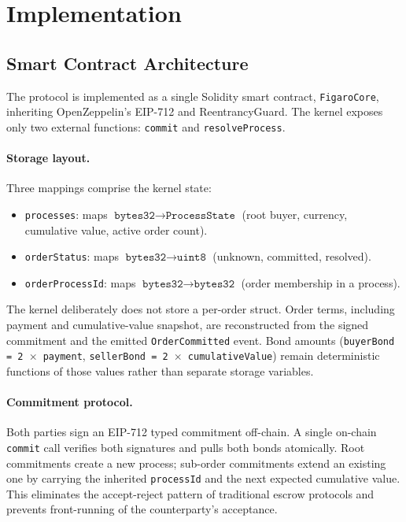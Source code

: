 \documentclass[11pt,a4paper]{article}
\theoremstyle{definition}
\theoremstyle{remark}
\begin{document}
\section{Implementation}
\label{sec:implementation}

\subsection{Smart Contract Architecture}

The protocol is implemented as a single Solidity smart contract,
\texttt{FigaroCore}, inheriting OpenZeppelin's EIP-712 and
ReentrancyGuard. The kernel exposes only two external functions:
\texttt{commit} and \texttt{resolveProcess}.

\paragraph{Storage layout.}
Three mappings comprise the kernel state:
\begin{itemize}
  \item \texttt{processes}: maps $\texttt{bytes32} \to
    \texttt{ProcessState}$ (root buyer, currency, cumulative value,
    active order count).
  \item \texttt{orderStatus}: maps $\texttt{bytes32} \to
    \texttt{uint8}$ (unknown, committed, resolved).
  \item \texttt{orderProcessId}: maps $\texttt{bytes32} \to
    \texttt{bytes32}$ (order membership in a process).
\end{itemize}
The kernel deliberately does not store a per-order struct. Order terms,
including payment and cumulative-value snapshot, are reconstructed from
the signed commitment and the emitted \texttt{OrderCommitted} event.
Bond amounts (\texttt{buyerBond = 2 $\times$ payment},
\texttt{sellerBond = 2 $\times$ cumulativeValue}) remain deterministic
functions of those values rather than separate storage variables.

\paragraph{Commitment protocol.}
Both parties sign an EIP-712 typed commitment off-chain. A single
on-chain \texttt{commit} call verifies both signatures and pulls both
bonds atomically. Root commitments create a new process; sub-order
commitments extend an existing one by carrying the inherited
\texttt{processId} and the next expected cumulative value. This
eliminates the accept-reject pattern of traditional escrow protocols and
prevents front-running of the counterparty's acceptance.
\end{document}
